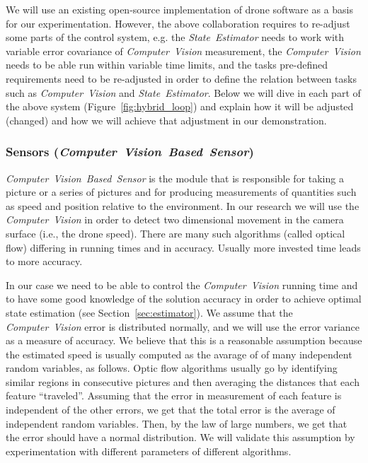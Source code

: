\documentclass[11pt]{article}
\begin{document}
We will use an existing open-source implementation of drone software as a basis for our experimentation. However, the above collaboration requires to re-adjust some parts of the control system, e.g. the \textit{State~Estimator} needs to work with variable error covariance of \textit{Computer~Vision} measurement,  the \textit{Computer~Vision} needs to be able run within variable time limits, and the tasks pre-defined requirements need to be re-adjusted in order to define the relation between tasks such as \textit{Computer~Vision} and \textit{State~Estimator}.
Below we will dive in each part of the above system (Figure~\ref{fig:hybrid_loop}) and explain how it will be adjusted (changed) and how we will achieve that adjustment in our demonstration.


\subsubsection{Sensors (\textit{Computer~Vision~Based~Sensor})}
\label{sec:sensors}

\textit{Computer~Vision~Based~Sensor} is the module that is responsible for taking a picture or a series of pictures and for producing measurements of quantities such as speed and position relative to the environment.
In our research we will use the \textit{Computer~Vision} in order to detect two dimensional movement in the camera surface (i.e., the drone speed).
There are many such algorithms (called optical flow) differing in running times and in accuracy. Usually more invested time leads to more accuracy.

In our case we need to be able to control the \textit{Computer~Vision} running time and to have some good knowledge of the solution accuracy in order to achieve optimal state estimation (see Section~\ref{sec:estimator}).
We assume that the \textit{Computer~Vision} error is distributed normally, and we will use the error variance as a measure of accuracy. 
We believe that this is a reasonable  assumption because the estimated speed is usually computed as the avarage of of many independent random variables, as follows. Optic flow algorithms usually go by identifying similar regions in consecutive pictures and then averaging the distances that each feature ``traveled''. Assuming that the error in measurement of each feature is independent of the other errors, we get that the total error is the average of independent random variables. Then, by the law of large numbers, we get that the error should have a normal distribution. We will validate this assumption by experimentation with different parameters of different algorithms.
\end{document}
